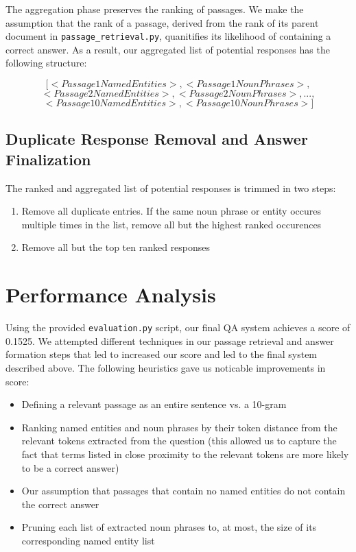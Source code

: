 \documentclass{article}
\begin{document}
The aggregation phase preserves the ranking of passages. We make the assumption that the rank of a passage, derived from the rank of its parent document in \texttt{passage\_retrieval.py}, quanitifies its likelihood of containing a correct answer. As a result, our aggregated list of potential responses has the following structure:

$$
[<Passage 1 Named Entities>, <Passage 1 Noun Phrases>, 
$$
$$
<Passage 2 Named Entities>, <Passage 2 Noun Phrases>, ... , 
$$
$$
<Passage 10 Named Entities>, <Passage 10 Noun Phrases>]
$$

\subsection{Duplicate Response Removal and Answer Finalization}
The ranked and aggregated list of potential responses is trimmed in two steps:
\begin{enumerate}
\item Remove all duplicate entries. If the same noun phrase or entity occures multiple times in the list, remove all but the highest ranked occurences
\item Remove all but the top ten ranked responses
\end{enumerate}

\section{Performance Analysis}
Using the provided \texttt{evaluation.py} script, our final QA system achieves a score of 0.1525. We attempted different techniques in our passage retrieval and answer formation steps that led to increased our score and led to the final system described above. The following heuristics gave us noticable improvements in score:
\begin{itemize}
\item Defining a relevant passage as an entire sentence vs. a 10-gram
\item Ranking named entities and noun phrases by their token distance from the relevant tokens extracted from the question (this allowed us to capture the fact that terms listed in close proximity to the relevant tokens are more likely to be a correct answer)
\item Our assumption that passages that contain no named entities do not contain the correct answer
\item Pruning each list of extracted noun phrases to, at most, the size of its corresponding named entity list
\end{itemize}
\end{document}
